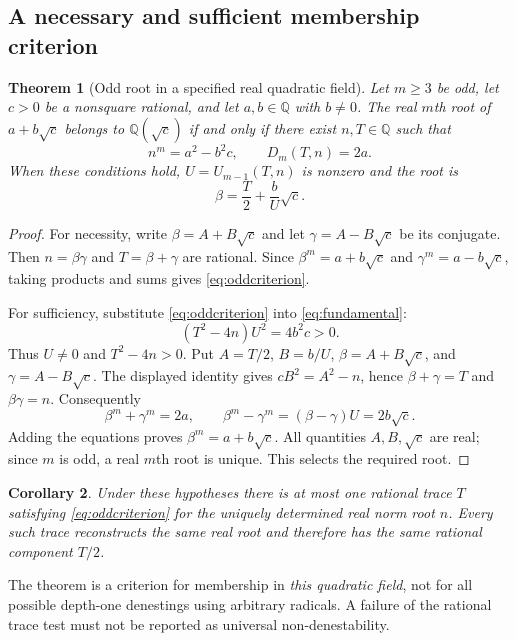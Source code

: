 \documentclass[11pt,a4paper]{article}
\newcommand{\Q}{\mathbb Q}\newcommand{\R}{\mathbb R}\newcommand{\C}{\mathbb C}
\newtheorem{theorem}{Theorem}[section]
\newtheorem{corollary}[theorem]{Corollary}
\theoremstyle{remark}\newtheorem{remark}[theorem]{Remark}
\begin{document}
\subsection{A necessary and sufficient membership criterion}
\begin{theorem}[Odd root in a specified real quadratic field]
Let $m\ge3$ be odd, let $c>0$ be a nonsquare rational, and let $a,b\in\Q$ with $b\ne0$. The real $m$th root of $a+b\sqrt c$ belongs to $\Q(\sqrt c)$ if and only if there exist $n,T\in\Q$ such that
\begin{equation}\label{eq:oddcriterion}
 n^m=a^2-b^2c,\qquad D_m(T,n)=2a.
\end{equation}
When these conditions hold, $U=U_{m-1}(T,n)$ is nonzero and the root is
\begin{equation}\label{eq:oddreconstruction}
 \beta=\frac T2+\frac bU\sqrt c.
\end{equation}
\end{theorem}
\begin{proof}
For necessity, write $\beta=A+B\sqrt c$ and let $\gamma=A-B\sqrt c$ be its conjugate. Then $n=\beta\gamma$ and $T=\beta+\gamma$ are rational. Since $\beta^m=a+b\sqrt c$ and $\gamma^m=a-b\sqrt c$, taking products and sums gives \eqref{eq:oddcriterion}.

For sufficiency, substitute \eqref{eq:oddcriterion} into \eqref{eq:fundamental}:
\[
 (T^2-4n)U^2=4b^2c>0.
\]
Thus $U\ne0$ and $T^2-4n>0$. Put $A=T/2$, $B=b/U$, $\beta=A+B\sqrt c$, and $\gamma=A-B\sqrt c$. The displayed identity gives $cB^2=A^2-n$, hence $\beta+\gamma=T$ and $\beta\gamma=n$. Consequently
\[
 \beta^m+\gamma^m=2a,\qquad
 \beta^m-\gamma^m=(\beta-\gamma)U=2b\sqrt c.
\]
Adding the equations proves $\beta^m=a+b\sqrt c$. All quantities $A,B,\sqrt c$ are real; since $m$ is odd, a real $m$th root is unique. This selects the required root.
\end{proof}

\begin{corollary}
Under these hypotheses there is at most one rational trace $T$ satisfying \eqref{eq:oddcriterion} for the uniquely determined real norm root $n$. Every such trace reconstructs the same real root and therefore has the same rational component $T/2$.
\end{corollary}

The theorem is a criterion for membership in \emph{this quadratic field}, not for all possible depth-one denestings using arbitrary radicals. A failure of the rational trace test must not be reported as universal non-denestability.
\end{document}
